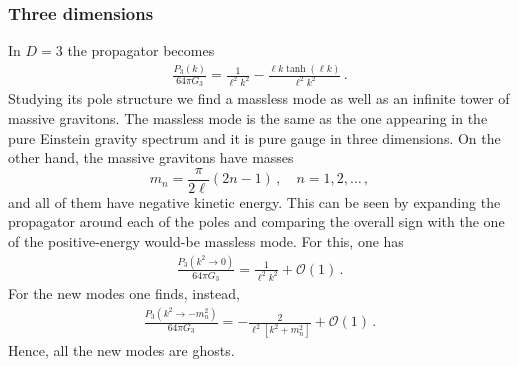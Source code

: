 \documentclass[11pt]{article}
\newcommand{\comment}[1]{{\bf [[[#1]]]}}
\begin{document}
{\subsubsection{Three dimensions}
In $D=3$ the propagator becomes
\begin{align}
\frac{P_{3}(k)}{64\pi G_3}=\frac{1}{\ell^2 k^2}-\frac{\ell k \tanh (\ell k)}{\ell^2 k^2}\, .
\end{align}
Studying its pole structure we find a massless mode as well as an infinite tower of massive gravitons. The massless mode is the same as the one appearing in the pure Einstein gravity spectrum and it is pure gauge in three dimensions. On the other hand, the massive gravitons have masses
\begin{equation}
 m_{n}=\frac{\pi}{2\ell }(2n-1)\, ,\quad n= 1,2, \ldots\, ,
\end{equation}
and all of them have negative kinetic energy. This can be seen by expanding the propagator around each of the poles and comparing the overall sign with the one of the positive-energy would-be massless mode. For this, one has
\begin{align}
\frac{P_{3}(k^2\rightarrow 0)}{64\pi G_3}=\frac{1}{\ell^2 k^2}+\mathcal{O}(1) \, .
\end{align}
For the new modes one finds, instead,
\begin{align}
\frac{P_{3}(k^2\rightarrow -m_n^2  )}{64\pi G_3}=-\frac{2}{\ell^2 [k^2+m_n^2]}+\mathcal{O}(1) \, .
\end{align}
Hence, all the new modes are ghosts. 


}
\end{document}
